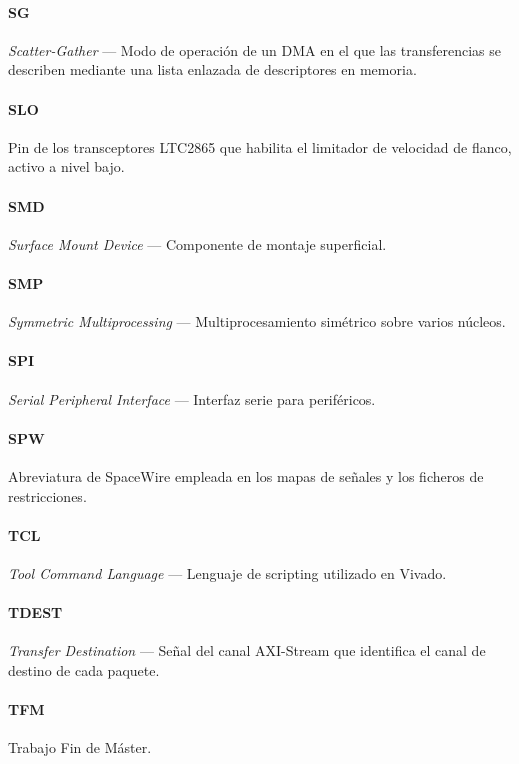 \paragraph{SG} \textit{Scatter-Gather} --- Modo de operación de un DMA en el que las transferencias se describen mediante una lista enlazada de descriptores en memoria.

\paragraph{SLO} Pin de los transceptores LTC2865 que habilita el limitador de velocidad de flanco, activo a nivel bajo.

\paragraph{SMD} \textit{Surface Mount Device} --- Componente de montaje superficial.

\paragraph{SMP} \textit{Symmetric Multiprocessing} --- Multiprocesamiento simétrico sobre varios núcleos.

\paragraph{SPI} \textit{Serial Peripheral Interface} --- Interfaz serie para periféricos.

\paragraph{SPW} Abreviatura de SpaceWire empleada en los mapas de señales y los ficheros de restricciones.

\paragraph{TCL} \textit{Tool Command Language} --- Lenguaje de scripting utilizado en Vivado.

\paragraph{TDEST} \textit{Transfer Destination} --- Señal del canal AXI-Stream que identifica el canal de destino de cada paquete.

\paragraph{TFM} Trabajo Fin de Máster.

